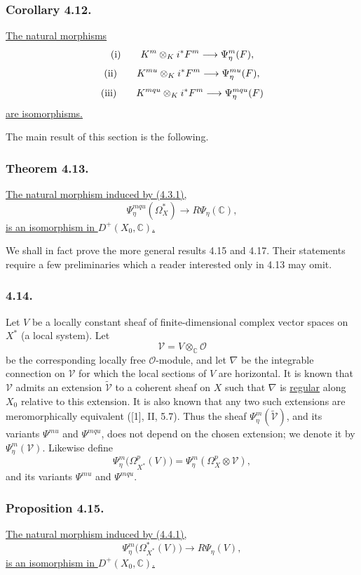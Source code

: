 \subsubsection*{Corollary 4.12.}
\underline{The natural morphisms}
\[
\textup{(i)}\qquad
K^m\otimes_K i^*F^m\longrightarrow\Psi_\eta^m(F),
\]
\[
\textup{(ii)}\qquad
K^{mu}\otimes_K i^*F^m\longrightarrow\Psi_\eta^{mu}(F),
\]
\[
\textup{(iii)}\qquad
K^{mqu}\otimes_K i^*F^m\longrightarrow\Psi_\eta^{mqu}(F)
\]
\underline{are isomorphisms.}

The main result of this section is the following.

\subsubsection*{Theorem 4.13.}
\underline{The natural morphism induced by (4.3.1),}
\begin{equation}\tag{4.13.1}
\Psi_\eta^{mqu}(\Omega_X^*)
\longrightarrow R\Psi_\eta(\mathbb C),
\end{equation}
\underline{is an isomorphism in $D^+(X_0,\mathbb C)$.}

We shall in fact prove the more general results 4.15 and 4.17.  Their
statements require a few preliminaries which a reader interested only
in 4.13 may omit.

\subsubsection*{4.14.}
Let $V$ be a locally constant sheaf of finite-dimensional complex
vector spaces on $X^*$ (a local system).  Let
\[
\mathcal V=V\otimes_{\mathbb C}\mathcal O
\]
be the corresponding locally free $\mathcal O$-module, and let
$\nabla$ be the integrable connection on $\mathcal V$ for which the
local sections of $V$ are horizontal.  It is known that $\mathcal V$
admits an extension $\widetilde{\mathcal V}$ to a coherent sheaf on
$X$ such that $\nabla$ is \underline{regular} along $X_0$ relative to
this extension.  It is also known that any two such extensions are
meromorphically equivalent ([1], II, 5.7).  Thus the sheaf
$\Psi_\eta^m(\widetilde{\mathcal V})$, and its variants
$\Psi^{mu}$ and $\Psi^{mqu}$, does not depend on the chosen extension;
we denote it by $\Psi_\eta^m(\mathcal V)$.  Likewise define
\[
\Psi_\eta^m\bigl(\Omega_{X^*}^p(V)\bigr)
=\Psi_\eta^m(\Omega_X^p\otimes\mathcal V),
\]
and its variants $\Psi^{mu}$ and $\Psi^{mqu}$.

\subsubsection*{Proposition 4.15.}
\underline{The natural morphism induced by (4.4.1),}
\begin{equation}\tag{4.15.1}
\Psi_\eta^m\bigl(\Omega_{X^*}^*(V)\bigr)
\longrightarrow R\Psi_\eta(V),
\end{equation}
\underline{is an isomorphism in $D^+(X_0,\mathbb C)$.}

